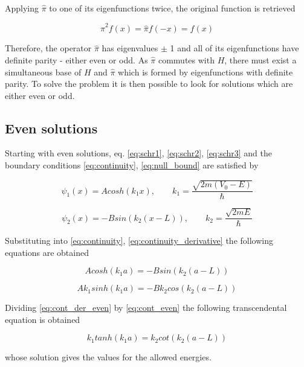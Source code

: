 \documentclass{article}
\begin{document}
Applying \(\hat{\pi}\) to one of its eigenfunctions twice, the original function is retrieved

\begin{equation}
\hat{\pi}^2f(x) = \hat{\pi}f(-x) = f(x)
\end{equation}

Therefore, the operator \(\hat{\pi}\) has eigenvalues \(\pm\) 1 and all of its eigenfunctions have definite parity - either even or odd. As \(\hat{\pi}\) commutes with \(H\), there must exist a simultaneous base of \(H\) and \(\hat{\pi}\) which is formed by eigenfunctions with definite parity. To solve the problem it is then possible to look for solutions which are either even or odd.

\subsection{Even solutions}
Starting with even solutions, eq. \eqref{eq:schr1}, \eqref{eq:schr2}, \eqref{eq:schr3} and the boundary conditions \eqref{eq:continuity}, \eqref{eq:null_bound} are satisfied by

\begin{equation}
\psi_{1}(x) = A cosh(k_{1} x), \qquad k_{1} = \frac{\sqrt{2m(V_{0} - E)}}{\hbar}
\end{equation}

\begin{equation}
\psi_{2}(x) = - B sin(k_{2}(x-L)), \qquad k_{2} = \frac{\sqrt{2mE}}{\hbar}
\end{equation}

Substituting into \eqref{eq:continuity}, \eqref{eq:continuity_derivative} the following equations are obtained

\begin{equation}
\label{eq:cont_even}
A cosh(k_{1}a) =  - B sin(k_{2}(a-L))
\end{equation}

\begin{equation}
\label{eq:cont_der_even}
A k_{1} sinh(k_{1}a) = - B k_{2} cos(k_{2}(a-L))
\end{equation}

Dividing \eqref{eq:cont_der_even} by \eqref{eq:cont_even} the following transcendental equation is obtained

\begin{equation}
\label{eq:trans_even}
k_{1} tanh(k_{1}a) = k_{2} cot(k_{2}(a-L))
\end{equation}

whose solution gives the values for the allowed energies.
\end{document}
